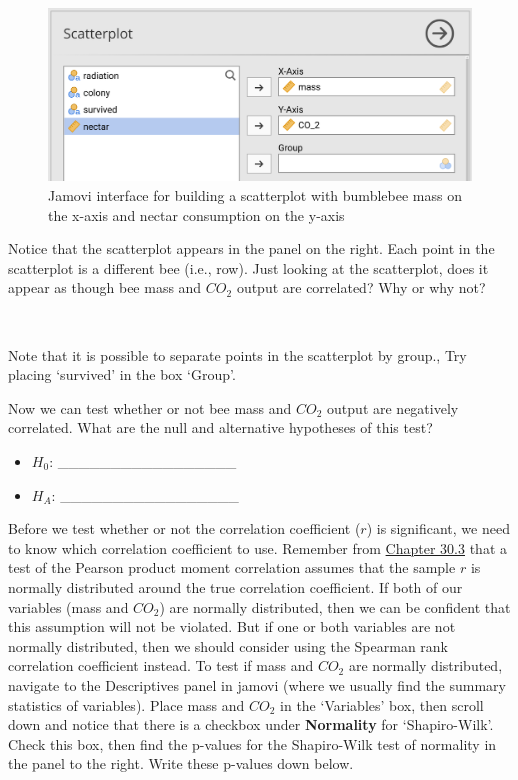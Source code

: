 \documentclass[
  openany]{scrbook}
\begin{document}
\begin{figure}
\includegraphics[width=1\linewidth]{img/jamovi_simple_scatterplot} \caption{Jamovi interface for building a scatterplot with bumblebee mass on the x-axis and nectar consumption on the y-axis}\label{fig:unnamed-chunk-134}
\end{figure}

Notice that the scatterplot appears in the panel on the right.
Each point in the scatterplot is a different bee (i.e., row).
Just looking at the scatterplot, does it appear as though bee mass and \(CO_2\) output are correlated?
Why or why not?

\begin{verbatim}


\end{verbatim}

Note that it is possible to separate points in the scatterplot by group.,
Try placing `survived' in the box `Group'.

Now we can test whether or not bee mass and \(CO_{2}\) output are negatively correlated.
What are the null and alternative hypotheses of this test?

\begin{itemize}
\item
  \(H_{0}\): \_\_\_\_\_\_\_\_\_\_\_\_\_\_\_\_\_
\item
  \(H_{A}\): \_\_\_\_\_\_\_\_\_\_\_\_\_\_\_\_\_
\end{itemize}

Before we test whether or not the correlation coefficient (\(r\)) is significant, we need to know which correlation coefficient to use.
Remember from \protect\hyperlink{correlation-hypothesis-testing}{Chapter 30.3} that a test of the Pearson product moment correlation assumes that the sample \(r\) is normally distributed around the true correlation coefficient.
If both of our variables (mass and \(CO_{2}\)) are normally distributed, then we can be confident that this assumption will not be violated.
But if one or both variables are not normally distributed, then we should consider using the Spearman rank correlation coefficient instead.
To test if mass and \(CO_{2}\) are normally distributed, navigate to the Descriptives panel in jamovi (where we usually find the summary statistics of variables).
Place mass and \(CO_{2}\) in the `Variables' box, then scroll down and notice that there is a checkbox under \textbf{Normality} for `Shapiro-Wilk'.
Check this box, then find the p-values for the Shapiro-Wilk test of normality in the panel to the right.
Write these p-values down below.
\end{document}
